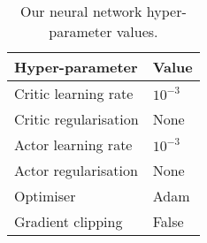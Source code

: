 \begin{table}[!htb]
\centering
\small
\begin{tabularx}{0.5\textwidth}{RL} 
    \hline
    \textbf{Hyper-parameter} & \textbf{Value} \\ 
    \hline
    Critic learning rate &              $10^{-3}$ \\
    Critic regularisation &             None \\
    Actor learning rate &               $10^{-3}$ \\
    Actor regularisation &              None \\
    Optimiser &                         Adam \\
    Gradient clipping &                 False \\
    \hline
\end{tabularx}
\caption[Neural network hyper-parameter values]{Our neural network hyper-parameter values.}
\label{tab:neural_network_parameters}
\end{table}
